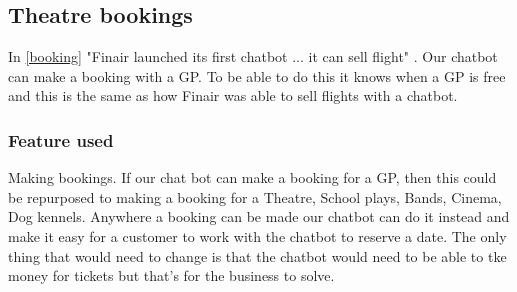 \documentclass{article}
\begin{document}
\subsection{Theatre bookings}
In \ref{booking} "Finair launched its first chatbot ... it can sell flight" \cite{booking}. Our chatbot can make a booking with a GP. To be able to do this it knows when a GP is free and  this is the same as how Finair was able to sell flights with a chatbot. 
\subsubsection{Feature used}
Making bookings. If our chat bot can make a booking for a GP, then this could be repurposed to making a booking for a Theatre, School plays, Bands, Cinema, Dog kennels.
Anywhere a booking can be made our chatbot can do it instead and make it easy for a customer to work with the chatbot to reserve a date. The only thing that would need to change is that the chatbot would need to be able to tke money for tickets but that's for the business to solve.


\end{document}
